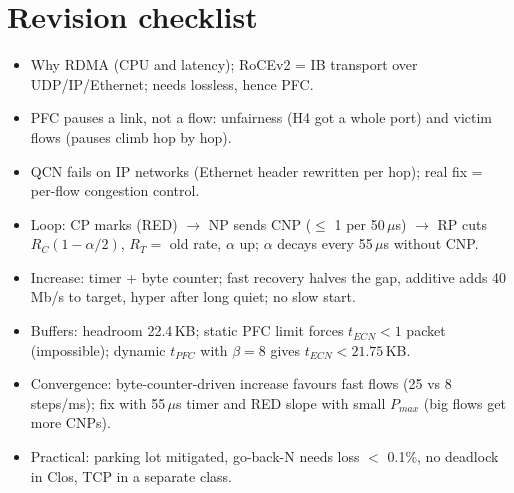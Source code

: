 \section{Revision checklist}
\begin{itemize}
  \item Why RDMA (CPU and latency); RoCEv2 = IB transport over UDP/IP/Ethernet; needs lossless, hence PFC.
  \item PFC pauses a link, not a flow: unfairness (H4 got a whole port) and victim flows (pauses climb hop by hop).
  \item QCN fails on IP networks (Ethernet header rewritten per hop); real fix = per-flow congestion control.
  \item Loop: CP marks (RED) $\to$ NP sends CNP ($\le$ 1 per 50\,$\mu$s) $\to$ RP cuts $R_C(1-\alpha/2)$, $R_T = $ old rate, $\alpha$ up; $\alpha$ decays every 55\,$\mu$s without CNP.
  \item Increase: timer + byte counter; fast recovery halves the gap, additive adds 40\,Mb/s to target, hyper after long quiet; no slow start.
  \item Buffers: headroom 22.4\,KB; static PFC limit forces $t_{ECN} < 1$ packet (impossible); dynamic $t_{PFC}$ with $\beta = 8$ gives $t_{ECN} < 21.75$\,KB.
  \item Convergence: byte-counter-driven increase favours fast flows (25 vs 8 steps/ms); fix with 55\,$\mu$s timer and RED slope with small $P_{max}$ (big flows get more CNPs).
  \item Practical: parking lot mitigated, go-back-N needs loss $<$ 0.1\%, no deadlock in Clos, TCP in a separate class.
\end{itemize}

